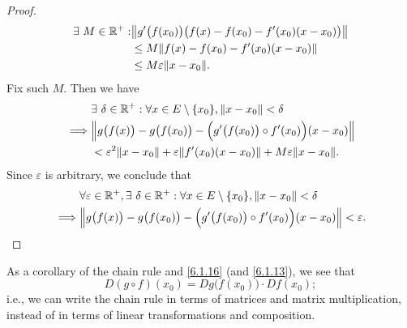 \begin{proof}
  \begin{align*}
    \exists\ M \in \R^+ : & \norm*{g'\big(f(x_0)\big) \big(f(x) - f(x_0) - f'(x_0) (x - x_0)\big)} \\
                          & \leq M \norm*{f(x) - f(x_0) - f'(x_0) (x - x_0)}                       \\
                          & \leq M \varepsilon \norm*{x - x_0}.
  \end{align*}
  Fix such \(M\).
  Then we have
  \begin{align*}
             & \exists\ \delta \in \R^+ : \forall x \in E \setminus \{x_0\}, \norm*{x - x_0} < \delta                  \\
    \implies & \norm*{g\big(f(x)\big) - g\big(f(x_0)\big) - \Big(g'\big(f(x_0)\big) \circ f'(x_0)\Big) (x - x_0)}      \\
             & < \varepsilon^2 \norm*{x - x_0} + \varepsilon \norm*{f'(x_0)(x - x_0)} + M \varepsilon \norm*{x - x_0}.
  \end{align*}
  Since \(\varepsilon\) is arbitrary, we conclude that
  \begin{align*}
             & \forall \varepsilon \in \R^+, \exists\ \delta \in \R^+ : \forall x \in E \setminus \{x_0\}, \norm*{x - x_0} < \delta \\
    \implies & \norm*{g\big(f(x)\big) - g\big(f(x_0)\big) - \Big(g'\big(f(x_0)\big) \circ f'(x_0)\Big) (x - x_0)} < \varepsilon.
  \end{align*}
\end{proof}

\begin{note}
  As a corollary of the chain rule and \cref{6.1.16} (and \cref{6.1.13}), we see that
  \[
    D (g \circ f)(x_0) = D g\big(f(x_0)\big) \cdot D f(x_0);
  \]
  i.e., we can write the chain rule in terms of matrices and matrix multiplication, instead of in terms of linear transformations and composition.
\end{note}

